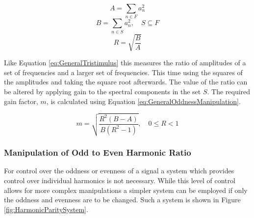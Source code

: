 		\[ A = \sum_{n \in F} a_{n}^{2} \]
		\[ B = \sum_{n \in S} a_{n}^{2}, \quad S \subseteq F \]
		\begin{equation}
			R = \sqrt{\frac{B}{A}}
			\label{eq:GeneralOddness}
		\end{equation}

		Like Equation \ref{eq:GeneralTristimulus} this measures the ratio of amplitudes of a set of frequencies and
		a larger set of frequencies. This time using the squares of the amplitudes and taking the square root
		afterwards. The value of the ratio can be altered by applying gain to the spectral components in the set
		$S$. The required gain factor, $m$, is calculated using Equation \ref{eq:GeneralOddnessManipulation}.

		\begin{equation}
			m = \sqrt{\frac{R^{2}(B - A)}{B(R^{2} - 1)}}, \quad 0 \leq R < 1
			\label{eq:GeneralOddnessManipulation}
		\end{equation}

		\subsubsection*{Manipulation of Odd to Even Harmonic Ratio}
			For control over the oddness or evenness of a signal a system which provides control over
			individual harmonics is not necessary. While this level of control allows for more complex
			manipulations a simpler system can be employed if only the oddness and evenness are to be changed.
			Such a system is shown in Figure \ref{fig:HarmonicParitySystem}.

